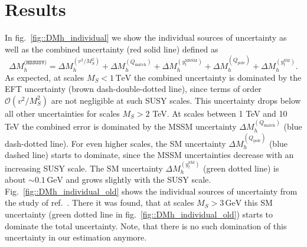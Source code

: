 \documentclass[a4paper,12pt]{book}
\begin{document}
\section{Results}
In fig.\ \ref{fig::DMh_individual} we show the individual sources of uncertainty as well as the combined uncertainty (red solid line) defined as 
\begin{equation}
\label{eq::DMhtotal}
\Delta M_h^\texttt{(HSSUSY)} =\Delta M_h^{(v^2/M_S^2)}+\Delta M_h^{(Q_\text{match})}+\Delta M_h^{(y_t^\text{MSSM})}+\Delta M_h^{(Q_\text{pole})}+\Delta M_h^{(y_t^\text{SM})}.
\end{equation}
As expected, at scales $M_S < 1\,\mathrm{TeV}$ the combined uncertainty is dominated by the EFT uncertainty (brown dash-double-dotted line), since terms of order $\mathcal{O}(v^2/M_S^2)$ are not negligible at such SUSY scales. This uncertainty drops below all other uncertainties for scales $M_S>2$ TeV. At scales between 1 TeV and 10 TeV the combined error is dominated by the MSSM uncertainty $\Delta M_h^{(Q_\text{match})}$ (blue dash-dotted line). For even higher scales, the SM uncertainty $\Delta M_h^{(Q_\text{pole})}$ (blue dashed line) starts to dominate, since the MSSM uncertainties decrease with an increasing SUSY scale. The SM uncertainty $\Delta M_h^{(y_t^\text{SM})}$ (green dotted line) is about $\sim 0.1\,\mathrm{GeV}$ and grows slightly with the SUSY scale. Fig.\ \ref{fig::DMh_individual_old} shows the individual sources of uncertainty from the study of ref.\ \cite{allanachvoigt}. There it was found, that at scales $M_S>3\,\mathrm{GeV}$ this SM uncertainty (green dotted line in fig.\ \ref{fig::DMh_individual_old}) starts to dominate the total uncertainty. Note, that there is no such domination of this uncertainty in our estimation anymore.
\end{document}
